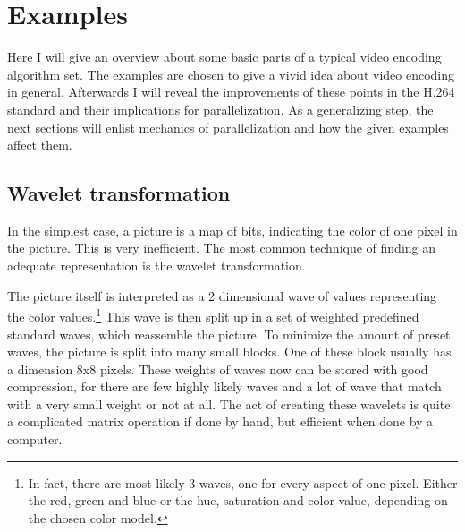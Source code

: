 \section{Examples}
\label{sec:examples}
Here I will give an overview about some basic parts of a typical video encoding algorithm set. The examples are chosen to give a vivid idea about video encoding in general. Afterwards I will reveal the improvements of these points in the H.264 standard and their implications for parallelization. As a generalizing step, the next sections will enlist mechanics of parallelization and how the given examples affect them.


\subsection{Wavelet transformation}
\label{susec:wt}
In the simplest case, a picture is a map of bits, indicating the color of one pixel in the picture. This is very inefficient. The most common technique of finding an adequate representation is the wavelet transformation.

The picture itself is interpreted as a 2 dimensional wave of values representing the color values.\footnote{In fact, there are most likely 3 waves, one for every aspect of one pixel. Either the red, green and blue or the hue, saturation and color value, depending on the chosen color model.}
This wave is then split up in a set of weighted predefined standard waves, which reassemble the picture. To minimize the amount of preset waves, the picture is split into many small blocks. One of these block usually has a dimension 8x8 pixels.
These weights of waves now can be stored with good compression, for there are few highly likely waves and a lot of wave that match with a very small weight or not at all.
The act of creating these wavelets is quite a complicated matrix operation if done by hand, but efficient when done by a computer.

